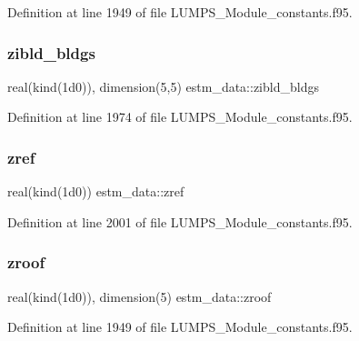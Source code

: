 Definition at line 1949 of file L\+U\+M\+P\+S\+\_\+\+Module\+\_\+constants.\+f95.

\mbox{\label{namespaceestm__data_a67d990e0db5db8d922ab38d6f4c0ec70}} 
\subsubsection{\texorpdfstring{zibld\+\_\+bldgs}{zibld\_bldgs}}
{\footnotesize\ttfamily real(kind(1d0)), dimension(5,5) estm\+\_\+data\+::zibld\+\_\+bldgs}



Definition at line 1974 of file L\+U\+M\+P\+S\+\_\+\+Module\+\_\+constants.\+f95.

\mbox{\label{namespaceestm__data_a7a588a40e148a295f285c787a02ade42}} 
\subsubsection{\texorpdfstring{zref}{zref}}
{\footnotesize\ttfamily real(kind(1d0)) estm\+\_\+data\+::zref}



Definition at line 2001 of file L\+U\+M\+P\+S\+\_\+\+Module\+\_\+constants.\+f95.

\mbox{\label{namespaceestm__data_af768a9da8007b24ee18243e681fb9fa7}} 
\subsubsection{\texorpdfstring{zroof}{zroof}}
{\footnotesize\ttfamily real(kind(1d0)), dimension(5) estm\+\_\+data\+::zroof}



Definition at line 1949 of file L\+U\+M\+P\+S\+\_\+\+Module\+\_\+constants.\+f95.

\mbox{\label{namespaceestm__data_af0b3ee5c82caffde6cad59e53acf41a2}} 
